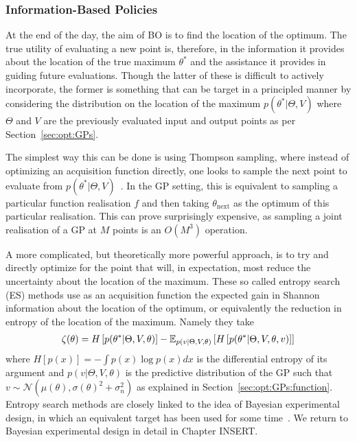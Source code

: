 \subsubsection{Information-Based Policies}
\label{sec:opt:BO:acq:inf}

At the end of the day, the aim of BO is to find the location of the optimum.  The true utility of
evaluating a new point is, therefore, in the information it provides about the location of the
true maximum $\theta^*$ and the assistance it provides in guiding future evaluations.  Though 
the latter of these is difficult to actively incorporate, the former is something that can be
target in a principled manner by considering the distribution on the location of the maximum
$p(\theta^* | \Theta, V)$ where $\Theta$ and $V$ are the previously evaluated input and output
points as per Section~\ref{sec:opt:GPs}.

The simplest way this can be done is using Thompson sampling\cite{thompson1933likelihood}, 
where instead of optimizing an acquisition function directly, one looks to sample the next
point to evaluate from $p(\theta^* | \Theta, V)$~\citep{shahriari2014entropy,kandasamy2017asynchronous}.  
In the GP setting, this is equivalent to sampling a particular function realisation $f$ and then taking 
$\theta_{\text{next}}$
as the optimum of this particular realisation.  This can prove surprisingly expensive, as sampling
a joint realisation of a GP at $M$ points is an $O(M^3)$ operation.  

A more complicated, but theoretically more powerful approach, is to try and directly optimize
for the point that will, in expectation, most reduce the uncertainty about the location of the maximum.
These so called entropy search (ES) methods 
\citep{villemonteix2009informational,hennig2012entropy,hernandez2014predictive} use as an
acquisition function the expected gain in Shannon information about the location of the optimum,
or equivalently the reduction in entropy of the location of the maximum. Namely they take
\begin{align}
\label{eq:opt:ent-search}
\zeta (\theta) = H\left[p(\theta^* | \Theta, V, \theta)\right]-
\mathbb{E}_{p(v| \Theta,V, \theta)} \left[H\left[p(\theta^* | \Theta, V, \theta, v)\right]\right]
\end{align}
where $H[p(x)]=-\int p(x)\log p(x)dx$ is the differential entropy of its argument
and $p(v| \Theta,V, \theta)$ is the predictive distribution of the GP such that
$v\sim\mathcal{N}\left(\mu(\theta),\sigma(\theta)^2+\sigma_n^2\right)$ as
explained in Section~\ref{sec:opt:GPs:function}.
Entropy search methods are closely linked to the idea of Bayesian experimental design, in which an equivalent
target has been used for some time~\cite{chaloner1995bayesian}.  We return to Bayesian experimental
design in detail in Chapter INSERT.

